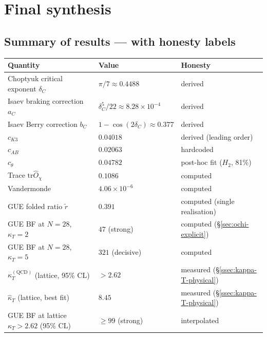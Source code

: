 \documentclass[11pt,a4paper]{article}
\newcommand{\dC}{\delta_C}
\newcommand{\Opchi}{\hat{O}_\chi}
\providecommand{\tr}{}
\renewcommand{\tr}{\mathrm{tr}}
\theoremstyle{plain}
\theoremstyle{definition}
\theoremstyle{remark}
\begin{document}
\section{Final synthesis}
\label{sec:synthesis}

\subsection{Summary of results --- with honesty labels}

\begin{table}[h]
\centering
\small
\begin{tabular}{l l l}
\toprule
Quantity & Value & Honesty \\
\midrule
Choptyuk critical exponent $\dC$    & $\pi/7 \approx 0.4488$ & derived \\
Isaev braking correction $a_C$      & $\dC^5/22 \approx 8.28\times 10^{-4}$ & derived \\
Isaev Berry correction $b_C$        & $1 - \cos(2\dC) \approx 0.377$ & derived \\
\midrule
$c_{K3}$   & $0.04018$ & derived (leading order) \\
$c_{AB}$   & $0.02063$ & hardcoded \\
$c_\theta$ & $0.04782$ & post-hoc fit ($H_2$, 81\%) \\
\midrule
Trace $\tr\Opchi$                                 & $0.1086$ & computed \\
Vandermonde                                       & $4.06\times 10^{-6}$ & computed \\
GUE folded ratio $\tilde r$                       & $0.391$ & computed (single realisation) \\
GUE BF at $N=28$, $\kappa_T=2$                    & $47$ (strong) & computed (\S\ref{sec:ochi-explicit}) \\
GUE BF at $N=28$, $\kappa_T=5$                    & $321$ (decisive) & computed \\
$\kappa_T^{(\mathrm{QCD})}$ (lattice, 95\% CL)     & $> 2.62$ & measured (\S\ref{ssec:kappa-T-physical}) \\
$\hat\kappa_T$ (lattice, best fit)                & $8.45$ & measured (\S\ref{ssec:kappa-T-physical}) \\
GUE BF at lattice $\kappa_T > 2.62$ (95\% CL)     & $\ge 99$ (strong) & interpolated \\

\end{tabular}
\end{table}
\end{document}
